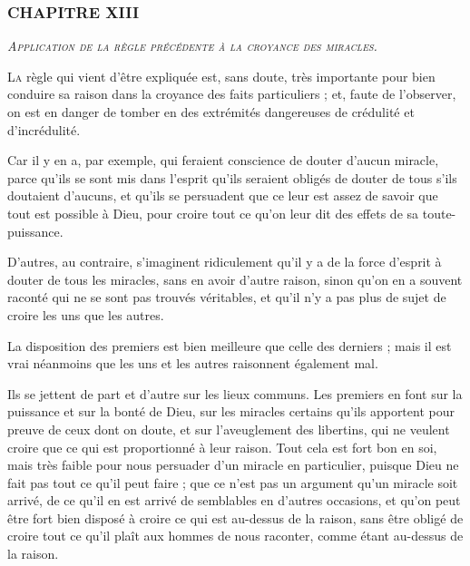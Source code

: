 \subsubsection{\centering \Large CHAPITRE XIII}
\begin{center}\emph{\large\scshape Application de la règle précédente à la croyance des miracles.}\end{center}

	\lettrine{L}{a} règle qui vient d'être expliquée est, sans doute, très importante pour bien conduire sa raison dans la croyance des faits particuliers ; et, faute de l'observer, on est en danger de tomber en des extrémités dangereuses de crédulité et d'incrédulité.

Car il y en a, par exemple, qui feraient conscience de douter d'aucun miracle, parce qu'ils se sont mis dans l'esprit qu'ils seraient obligés de douter de tous s'ils doutaient d'aucuns, et qu'ils se persuadent que ce leur est assez de savoir que tout est possible à Dieu, pour croire tout ce qu'on leur dit des effets de sa toute-puissance.

D'autres, au contraire, s'imaginent ridiculement qu'il y a de la force d'esprit à douter de tous les miracles, sans en avoir d'autre raison, sinon qu'on en a souvent raconté qui ne se sont pas trouvés véritables, et qu'il n'y a pas plus de sujet de croire les uns que les autres.

La disposition des premiers est bien meilleure que celle des derniers ; mais il est vrai néanmoins que les uns et les autres raisonnent également mal.

Ils se jettent de part et d'autre sur les lieux communs. Les premiers en font sur la puissance et sur la bonté de Dieu, sur les miracles certains qu'ils apportent pour preuve de ceux dont on doute, et sur l'aveuglement des libertins, qui ne veulent croire que ce qui est proportionné à leur raison. Tout cela est fort bon en soi, mais très faible pour nous persuader d'un miracle en particulier, puisque Dieu ne fait pas tout ce qu'il peut faire ; que ce n'est pas un argument qu'un miracle soit arrivé, de ce qu'il en est arrivé de semblables en d'autres occasions, et qu'on peut être fort bien disposé à croire ce qui est au-dessus de la raison, sans être obligé de croire tout ce qu'il plaît aux hommes de nous raconter, comme étant au-dessus de la raison.


